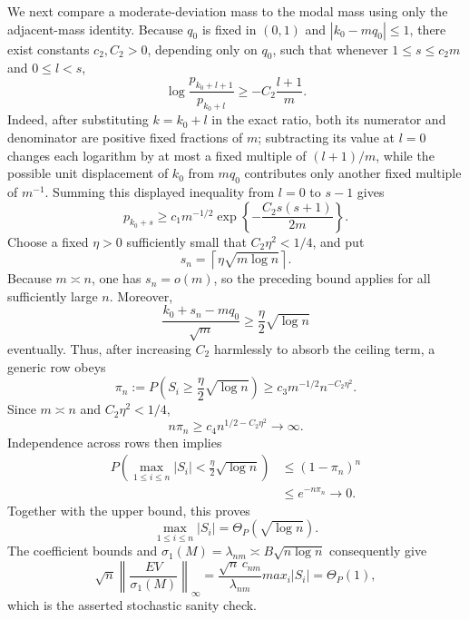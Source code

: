 We next compare a moderate-deviation mass to the modal mass using only the adjacent-mass identity.  Because \(q_0\) is fixed in \((0,1)\) and \(|k_0-mq_0|\le1\), there exist constants \(c_2,C_2>0\), depending only on \(q_0\), such that whenever \(1\le s\le c_2m\) and \(0\le l<s\),
\[
 \log\frac{p_{k_0+l+1}}{p_{k_0+l}}
 \ge-C_2\frac{l+1}{m}.
\]
Indeed, after substituting \(k=k_0+l\) in the exact ratio, both its numerator and denominator are positive fixed fractions of \(m\); subtracting its value at \(l=0\) changes each logarithm by at most a fixed multiple of \((l+1)/m\), while the possible unit displacement of \(k_0\) from \(mq_0\) contributes only another fixed multiple of \(m^{-1}\).  Summing this displayed inequality from \(l=0\) to \(s-1\) gives
\[
 p_{k_0+s}
 \ge c_1m^{-1/2}
 \exp\!\left\{-\frac{C_2s(s+1)}{2m}\right\}.
\]
Choose a fixed \(\eta>0\) sufficiently small that \(C_2\eta^2<1/4\), and put
\[
 s_n=\left\lceil\eta\sqrt{m\log n}\right\rceil.
\]
Because \(m\asymp n\), one has \(s_n=o(m)\), so the preceding bound applies for all sufficiently large \(n\).  Moreover,
\[
 \frac{k_0+s_n-mq_0}{\sqrt m}
 \ge\frac{\eta}{2}\sqrt{\log n}
\]
eventually.  Thus, after increasing \(C_2\) harmlessly to absorb the ceiling term, a generic row obeys
\[
 \pi_n
 :=P\!\left(S_i\ge\frac{\eta}{2}\sqrt{\log n}\right)
 \ge c_3m^{-1/2}n^{-C_2\eta^2}.
\]
Since \(m\asymp n\) and \(C_2\eta^2<1/4\),
\[
 n\pi_n\ge c_4 n^{1/2-C_2\eta^2}\longrightarrow\infty.
\]
Independence across rows then implies
\[
 \begin{aligned}
 P\!\left(\max_{1\le i\le n}|S_i|
 <\frac{\eta}{2}\sqrt{\log n}\right)
 &\le(1-\pi_n)^n\\
 &\le e^{-n\pi_n}\longrightarrow0.
 \end{aligned}
\]
Together with the upper bound, this proves
\[
 \max_{1\le i\le n}|S_i|=\Theta_P(\sqrt{\log n}).
\]
The coefficient bounds and \(\sigma_1(M)=\lambda_{nm}\asymp B\sqrt{n\log n}\) consequently give
\[
 \sqrt n\left\lVert\frac{EV}{\sigma_1(M)}\right\rVert_\infty
 =\frac{\sqrt n\,c_{nm}}{\lambda_{nm}}max_i|S_i|
 =\Theta_P(1),
\]
which is the asserted stochastic sanity check.

